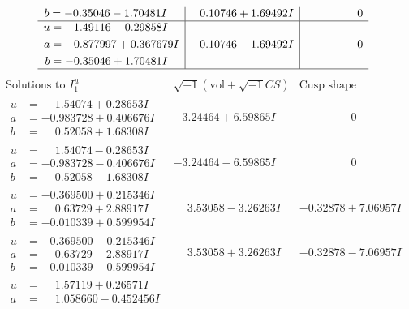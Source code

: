 \documentclass[1p]{elsarticle_modified}
\theoremstyle{definition}
\newcommand{\I}{\sqrt{-1}}
\begin{document}
$$\begin{array}{c|c|c}
\begin{aligned}
b &= -0.35046 - 1.70481 I\end{aligned}
 & \phantom{-}0.10746 + 1.69492 I & \phantom{-0.000000 } 0 \\ \hline\begin{aligned}
u &= \phantom{-}1.49116 - 0.29858 I \\
a &= \phantom{-}0.877997 + 0.367679 I \\
b &= -0.35046 + 1.70481 I\end{aligned}
 & \phantom{-}0.10746 - 1.69492 I & \phantom{-0.000000 } 0\\
 \hline 
 \end{array}$$\newpage$$\begin{array}{c|c|c}  
\text{Solutions to }I^u_{1}& \I (\text{vol} + \sqrt{-1}CS) & \text{Cusp shape}\\
 \hline 
\begin{aligned}
u &= \phantom{-}1.54074 + 0.28653 I \\
a &= -0.983728 + 0.406676 I \\
b &= \phantom{-}0.52058 + 1.68308 I\end{aligned}
 & -3.24464 + 6.59865 I & \phantom{-0.000000 } 0 \\ \hline\begin{aligned}
u &= \phantom{-}1.54074 - 0.28653 I \\
a &= -0.983728 - 0.406676 I \\
b &= \phantom{-}0.52058 - 1.68308 I\end{aligned}
 & -3.24464 - 6.59865 I & \phantom{-0.000000 } 0 \\ \hline\begin{aligned}
u &= -0.369500 + 0.215346 I \\
a &= \phantom{-}0.63729 + 2.88917 I \\
b &= -0.010339 + 0.599954 I\end{aligned}
 & \phantom{-}3.53058 - 3.26263 I & -0.32878 + 7.06957 I \\ \hline\begin{aligned}
u &= -0.369500 - 0.215346 I \\
a &= \phantom{-}0.63729 - 2.88917 I \\
b &= -0.010339 - 0.599954 I\end{aligned}
 & \phantom{-}3.53058 + 3.26263 I & -0.32878 - 7.06957 I \\ \hline\begin{aligned}
u &= \phantom{-}1.57119 + 0.26571 I \\
a &= \phantom{-}1.058660 - 0.452456 I \\

\end{aligned}
\end{array}$$
\end{document}
